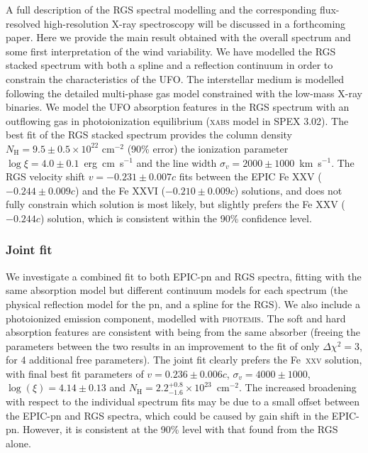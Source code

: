 \documentclass[10pt, a4paper]{article}
\begin{document}
A full description of the RGS spectral modelling and the corresponding flux-resolved high-resolution X-ray spectroscopy will be discussed in a forthcoming paper. Here we provide the main result obtained with the overall spectrum and some first interpretation of the wind variability. We have modelled the RGS stacked spectrum with both a spline and a reflection continuum in order to constrain the characteristics of the UFO. The interstellar medium is modelled following the detailed multi-phase gas model constrained with the low-mass X-ray binaries\cite{Pinto13}. We model the UFO absorption features in the RGS spectrum with an outflowing gas in photoionization equilibrium (\textsc{xabs} model in SPEX 3.02). The best fit of the RGS stacked spectrum provides the column density $N_\mathrm{H} = 9.5 \pm 0.5 \times 10^{22}$ cm$^{-2}$ (90\% error) the ionization parameter $\log{\xi}= 4.0 \pm 0.1$~erg~cm~s$^{-1}$ and the line width
$\sigma_v = 2000 \pm 1000$~km~s$^{-1}$. The RGS velocity shift $v = -0.231 \pm 0.007 c$
fits between the EPIC Fe XXV ($-0.244 \pm 0.009 c$) and the Fe XXVI ($-0.210 \pm 0.009 c$) solutions, and does not fully constrain which solution is most likely, but slightly prefers the Fe XXV ($-0.244c$) solution, which is consistent within the 90\% confidence level.

\subsubsection*{Joint fit}

We investigate a combined fit to both EPIC-pn and RGS spectra, fitting with the same absorption model but different continuum models for each spectrum (the physical reflection model for the pn, and a spline for the RGS). We also include a photoionized emission component, modelled with \textsc{photemis}. The soft and hard absorption features are consistent with being from the same absorber (freeing the parameters between the two results in an improvement to the fit of only $\Delta\chi^2=3$, for 4 additional free parameters). 
The joint fit clearly prefers the Fe~\textsc{xxv} solution, with final best fit parameters of $v=0.236\pm0.006c$, $\sigma_v=4000\pm1000$, $\log(\xi)=4.14\pm0.13$ and $N_\mathrm{H}=2.2^{+0.8}_{-1.6}\times10^{23}$~cm$^{-2}$. The increased broadening with respect to the individual spectrum fits may be due to a small offset between the EPIC-pn and RGS spectra, which could be caused by gain shift in the EPIC-pn. However, it is consistent at the 90\% level with that found from the RGS alone.
\end{document}
